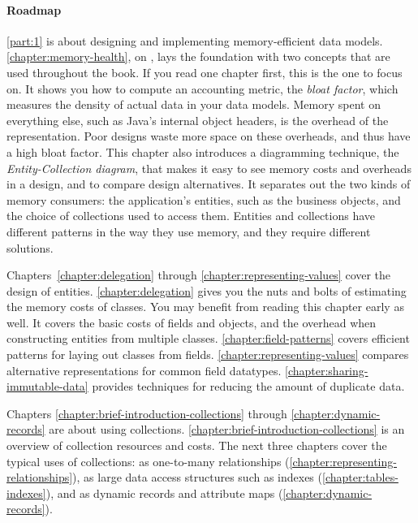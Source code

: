 \paragraph{Roadmap}\autoref{part:1} is about designing and implementing
memory-efficient data models. \autoref{chapter:memory-health}, on
, lays the foundation with two concepts that are used throughout the book. If you read one chapter first,
this is the one to focus on.
It shows you how to compute an accounting metric,
the \emph{bloat factor}, which measures the density of actual data in your
data models. Memory spent on everything else, such as
Java's internal object headers, is the overhead of the representation.
Poor designs waste more space on these overheads, and thus have a high bloat
factor. This chapter also introduces a diagramming technique,
the \emph{Entity-Collection diagram}, that makes it easy to see memory costs and
overheads in a design, and to compare design alternatives.
It separates out the two kinds of memory consumers:
%
the application's entities, such as the
business objects, and the choice of collections used to access them. Entities and collections have
different patterns in the way they use memory, and they require different solutions.

Chapters~\ref{chapter:delegation} through
\ref{chapter:representing-values} cover the design of
entities. \autoref{chapter:delegation} gives you the nuts and bolts of
estimating the memory costs of classes. You may benefit from reading this chapter early as
well. It covers the basic costs of fields and objects, and the overhead when
constructing entities from multiple classes.
\autoref{chapter:field-patterns} covers efficient patterns for laying out classes from fields.
\autoref{chapter:representing-values} compares alternative representations for common field datatypes. 
\autoref{chapter:sharing-immutable-data} provides techniques for
reducing the amount of duplicate data.

Chapters \ref{chapter:brief-introduction-collections} through
\ref{chapter:dynamic-records} are about
using collections. \autoref{chapter:brief-introduction-collections} is
an overview of collection resources and costs.
The next three chapters cover the typical uses of collections:
as one-to-many relationships (\autoref{chapter:representing-relationships}),
as large data access structures such as indexes
(\autoref{chapter:tables-indexes}), and as dynamic records and attribute maps
(\autoref{chapter:dynamic-records}).

